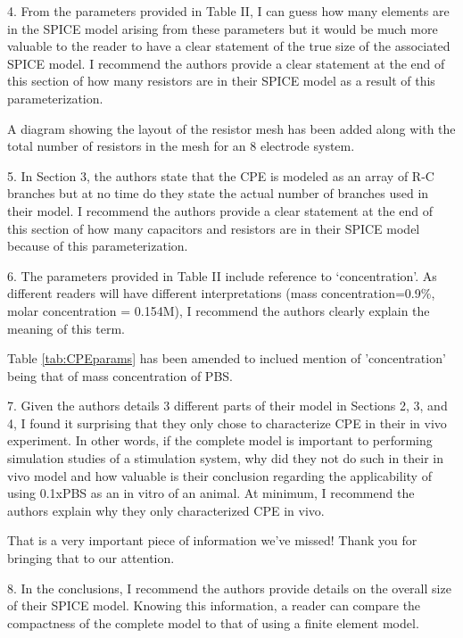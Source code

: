 \documentclass[journal, a4paper]{IEEEtran}
\begin{document}
{    4. From the parameters provided in Table II, I can guess how many elements are in the SPICE model arising from these parameters but it would be much more valuable to the reader to have a clear statement of the true size of the associated SPICE model. I recommend the authors provide a clear statement at the end of this section of how many resistors are in their SPICE model as a result of this parameterization.

    {
        \color{blue}
        A diagram showing the layout of the resistor mesh has been added along with the total number of resistors in the mesh for an 8 electrode system.
    }

    5. In Section 3, the authors state that the CPE is modeled as an array of R-C branches but at no time do they state the actual number of branches used in their model. I recommend the authors provide a clear statement at the end of this section of how many capacitors and resistors are in their SPICE model because of this parameterization.

    {
        \color{blue}

    }

    6. The parameters provided in Table II include reference to `concentration'. As different readers will have different interpretations (mass concentration=0.9\%, molar concentration = 0.154M), I recommend the authors clearly explain the meaning of this term.

    {
        \color{blue}
        Table \ref{tab:CPEparams} has been amended to inclued mention of 'concentration' being that of mass concentration of PBS.
    }

    7. Given the authors details 3 different parts of their model in Sections 2, 3, and 4, I found it surprising that they only chose to characterize CPE in their in vivo experiment. In other words, if the complete model is important to performing simulation studies of a stimulation system, why did they not do such in their in vivo model and how valuable is their conclusion regarding the applicability of using 0.1xPBS as an in vitro of an animal. At minimum, I recommend the authors explain why they only characterized CPE in vivo.

    {
        \color{blue}
        That is a very important piece of information we've missed! Thank you for bringing that to our attention.

    }

    8. In the conclusions, I recommend the authors provide details on the overall size of their SPICE model. Knowing this information, a reader can compare the compactness of the complete model to that of using a finite element model.

}
\end{document}

